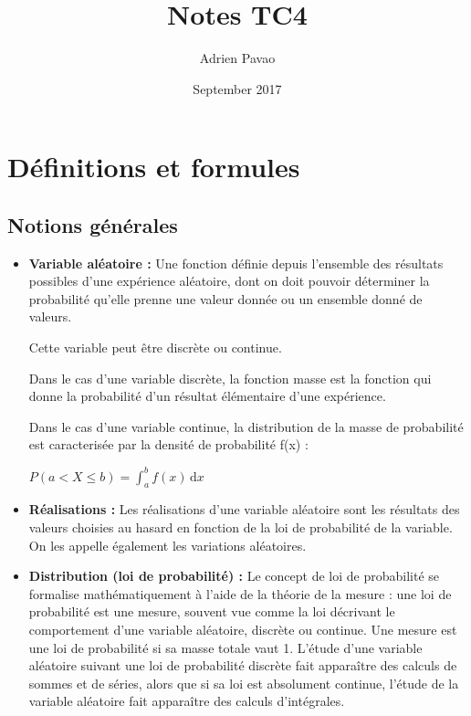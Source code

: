 \documentclass{article}
\title{Notes TC4}
\author{Adrien Pavao}
\date{September 2017}
\begin{document}
\maketitle

\tableofcontents

\section{Définitions et formules}

\subsection{Notions générales}

\begin{itemize}
\item \textbf{Variable aléatoire :} Une fonction définie depuis l'ensemble des résultats possibles d'une expérience aléatoire, dont on doit pouvoir déterminer la probabilité qu'elle prenne une valeur donnée ou un ensemble donné de valeurs. 

Cette variable peut être discrète ou continue.

Dans le cas d'une variable discrète, la fonction masse est la fonction qui donne la probabilité d'un résultat élémentaire d'une expérience.

Dans le cas d'une variable continue, la distribution de la masse de probabilité est caracterisée par la densité de probabilité f(x) : 

$ P(a < X \leq b)  = \displaystyle \int_{a}^{b} f(x) \, \mathrm{d}x  $

\item \textbf{Réalisations :} Les réalisations d'une variable aléatoire sont les résultats des valeurs choisies au hasard en fonction de la loi de probabilité de la variable. On les appelle également les variations aléatoires.

\item \textbf{Distribution (loi de probabilité) :} Le concept de loi de probabilité se formalise mathématiquement à l'aide de la théorie de la mesure : une loi de probabilité est une mesure, souvent vue comme la loi décrivant le comportement d'une variable aléatoire, discrète ou continue. Une mesure est une loi de probabilité si sa masse totale vaut 1. L'étude d'une variable aléatoire suivant une loi de probabilité discrète fait apparaître des calculs de sommes et de séries, alors que si sa loi est absolument continue, l'étude de la variable aléatoire fait apparaître des calculs d'intégrales.


\end{itemize}
\end{document}
